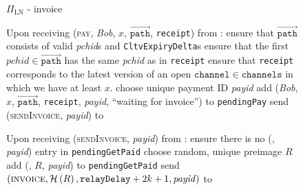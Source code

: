   \begin{figure}[H]
    \begin{protocolbox}{$\Pi_{\mathrm{LN}}$ - invoice}
      \begin{algorithmic}[1]
        \State Upon receiving (\textsc{pay}, \textit{Bob}, $x$,
        $\overrightarrow{\mathtt{path}}$, \texttt{receipt}) from \environment:
        \Indent
          \State ensure that $\overrightarrow{\mathtt{path}}$ consists of valid
          \textit{pchid}s and \texttt{CltvExpiryDelta}s 
          \State ensure that the first $\mathit{pchid} \in
          \overrightarrow{\mathtt{path}}$ has the same \textit{pchid} as in
          \texttt{receipt}
          \State ensure that \texttt{receipt} corresponds to the latest version
          of an open $\mathtt{channel} \in \mathtt{channels}$ in which we have
          at least $x$.
          \State choose unique payment ID \textit{payid} 
          \State add (\textit{Bob}, $x$, $\overrightarrow{\mathtt{path}}$,
          \texttt{receipt}, \textit{payid}, ``waiting for invoice'') to
          \texttt{pendingPay}
          \State send (\textsc{sendInvoice}, \textit{payid}) to \bob{}
        \EndIndent
        \Statex

        \State Upon receiving (\textsc{sendInvoice}, \textit{payid}) from \bob:
        \Indent
          \State ensure there is no (\bob, \textit{payid}) entry in
          \texttt{pendingGetPaid}
          \State choose random, unique preimage $R$
          \State add (\bob, $R$, \textit{payid}) to \texttt{pendingGetPaid}
          \State send $\left(\textsc{invoice}, \mathcal{H}\left(R\right),
          \mathtt{relayDelay} + 2k + 1, \mathit{payid}\right)$ to \bob{}
        \EndIndent
        \Statex


\end{algorithmic}
\end{protocolbox}
\end{figure}
